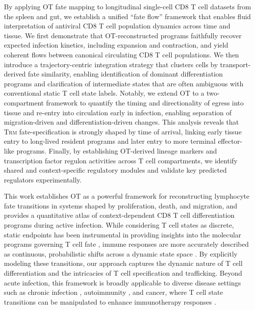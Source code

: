 By applying OT fate mapping to longitudinal single-cell CD8 T cell datasets from the spleen and gut, we establish a unified ``fate flow'' framework that enables fluid interpretation of antiviral CD8 T cell population dynamics across time and tissue. We first demonstrate that OT-reconstructed programs faithfully recover expected infection kinetics, including expansion and contraction, and yield coherent flows between canonical circulating CD8 T cell populations. We then introduce a trajectory-centric integration strategy that clusters cells by transport-derived fate similarity, enabling identification of dominant differentiation programs and clarification of intermediate states that are often ambiguous with conventional static T cell state labels. Notably, we extend OT to a two-compartment framework to quantify the timing and directionality of egress into tissue and re-entry into circulation early in infection, enabling separation of migration-driven and differentiation-driven changes. This analysis reveals that T\textsc{rm} fate-specification is strongly shaped by time of arrival, linking early tissue entry to long-lived resident programs and later entry to more terminal effector-like programs. Finally, by establishing OT-derived lineage markers and transcription factor regulon activities across T cell compartments, we identify shared and context-specific regulatory modules and validate key predicted regulators experimentally.

This work establishes OT as a powerful framework for reconstructing lymphocyte fate transitions in systems shaped by proliferation, death, and migration, and provides a quantitative atlas of context-dependent CD8 T cell differentiation programs during active infection. While considering T cell states as discrete, static endpoints has been instrumental in providing insights into the molecular programs governing T cell fate \citep{gilesSharedDistinctBiological2022, greenEnhancerdrivenGeneRegulatory2025, changMolecularRegulationEffector2014, kaechTranscriptionalControlEffector2012}, immune responses are more accurately described as continuous, probabilistic shifts across a dynamic state space \citep{gerlachHeterogeneousDifferentiationPatterns2013, moldDivergentClonalDifferentiation2021, moldClonallyHeritableGene2024, roychoudhuriTranscriptionalProfilesReveal2015}. By explicitly modeling these transitions, our approach captures the dynamic nature of T cell differentiation and the intricacies of T cell specification and trafficking. Beyond acute infection, this framework is broadly applicable to diverse disease settings such as chronic infection \citep{danielDivergentClonalDifferentiation2022, quezadaEarlyTranscriptionalEpigenetic2023}, autoimmunity \citep{geartyAutoimmuneStemlikeCD82022}, and cancer, where T cell state transitions can be manipulated to enhance immunotherapy responses \citep{ellisGeneticEngineeringCells2021, baileyConstructingCureEngineering2025}.

